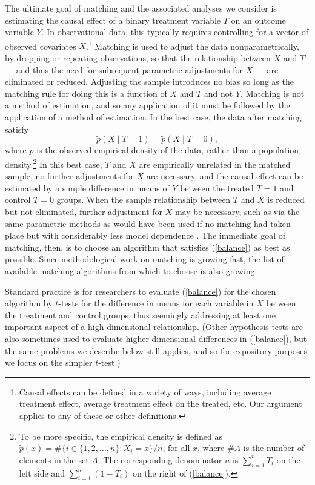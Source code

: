\documentclass[11pt,titlepage]{article}
\begin{document}
The ultimate goal of matching and the associated analyses
we consider is estimating the causal effect of a binary treatment
variable $T$ on an outcome variable $Y$.  In observational data, this
typically requires controlling for a vector of observed covariates
$X$.\footnote{Causal effects can be defined in a variety of ways,
  including average treatment effect, average treatment effect on the
  treated, etc.  Our argument applies to any of these or other
  definitions.}  Matching is used to adjust the data
nonparametrically, by dropping or repeating observations, so that the
relationship between $X$ and $T$ --- and thus the need for subsequent
parametric adjustments for $X$ --- are eliminated or reduced.
Adjusting the sample introduces no bias so long as the matching rule
for doing this is a function of $X$ and $T$ and not $Y$.  Matching is
not a method of estimation, and so any application of it must be
followed by the application of a method of estimation.  In the best
case, the data after matching satisfy
\begin{equation}
  \label{balance}
  \tilde p(X\mid T=1) = \tilde p(X\mid T=0),
\end{equation}
where $\tilde p$ is the observed empirical density of the data, rather
than a population density.\footnote{To be more specific, the empirical
  density is defined as $\tilde p(x) = \# \{ i\in \{1, 2, \dots, n \}:
  X_i = x \} / n$, for all $x$, where $\#A$ is the number of elements
  in the set $A$.  The corresponding denominator $n$ is $\sum_{i=1}^n
  T_i$ on the left side and $\sum_{i=1}^n (1-T_i)$ on the right of
  (\ref{balance}).} In this best case, $T$ and $X$ are empirically
unrelated in the matched sample, no further adjustments for $X$ are
necessary, and the causal effect can be estimated by a simple
difference in means of $Y$ between the treated $T=1$ and control $T=0$
groups.  When the sample relationship between $T$ and $X$ is reduced
but not eliminated, further adjustment for $X$ may be necessary, such
as via the same parametric methods as would have been used if no
matching had taken place but with considerably less model dependence
\citep{HoImaKin06}.  The immediate goal of matching, then, is to
choose an algorithm that satisfies (\ref{balance}) as best as
possible.  Since methodological work on matching is growing fast, the
list of available matching algorithms from which to choose is also
growing.

Standard practice is for researchers to evaluate (\ref{balance}) for
the chosen algorithm by $t$-tests for the difference in means for each
variable in $X$ between the treatment and control groups, thus
seemingly addressing at least one important aspect of a high
dimensional relationship.  (Other hypothesis tests are also sometimes
used to evaluate higher dimensional differences in (\ref{balance}), but
the same problems we describe below still applies, and so for
expository purposes we focus on the simpler $t$-test.)  
\end{document}
